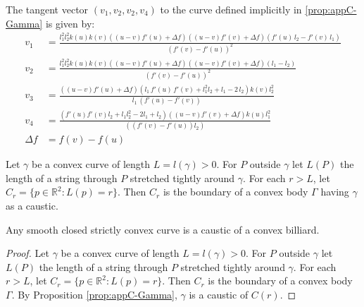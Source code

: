 \begin{remark}
The tangent vector $(v_1,v_2,v_2,v_4)$ to the curve defined implicitly in  \cref{prop:appC-Gamma} is given by:
{\small  
\begin{align*}
v_1&={\frac {l_1
^{2} l_2^{2} k \left( u \right) k \left( v \right)  \left( (u-v){f'(u)} +\Delta f \right)  \left( (u-v){f'(v)} +\Delta f \right)  \left( {f'(u)}\,{l_2}-{f'(v)}\,  
l_1 \right) }{ \left( {f'(v)}-{f'(u)} \right) ^{2}}}
\\
v_2&={\frac {l_1
^{2} l_2^{2} k \left( u \right) k \left( v \right)   \left( (u-v){f'(u)} +\Delta f \right)  \left( (u-v){f'(v)}  +\Delta f \right)  \left( {l_1}-{l_2} \right) }{
 \left(  {f'(v)}-{f'(u)} \right) ^{2}}}\\
v_3&={\frac { \left( (u-v){f'(u)} +\Delta f \right)  \left( {l_1
}\,{f'(u)}\,{f'(v)}+l_1^{2}{l_2}+{l_1}-2\,{l_2}
 \right) k(v) l_2^{2}}{{l_1}\, \left( {f'(u)}-{f'(v)
} \right) }}\\
v_4&=\frac{(f'(u) f'(v) l_2 + l_1 l_2^2 - 2 l_1 + l_2) ((u-v)f'(v)   + \Delta f) k(u) l_1^2 }{ ((f'(v) - f'(u)) l_2)}\\
 \Delta f& =f(v)-f(u)
\end{align*}
}
\end{remark}

 Let $\gamma$ be a convex curve of length $L=l(\gamma)>0$.
   For $P$  outside $\gamma$ let $ L(P)$   the length of a string through $P$ stretched tightly around $\gamma$. For each $r>L$, let $C_r=\{p\in\mathbb{R}^2: L(p)=r\}.$ Then  $C_r$ is the  boundary of a convex body $\Gamma$ having $\gamma$ as a caustic.
   
   
\begin{corollary}
  Any smooth closed strictly convex curve is a caustic of a convex billiard.
  \label{cor:appC-caustica}
\end{corollary}

\begin{proof}
 Let $\gamma$ be a convex curve of length $L=l(\gamma)>0$.
For $P$  outside $\gamma$ let $ L(P)$   the length of a string through $P$ stretched tightly around $\gamma$. For each $r>L$, let $C_r=\{p\in\mathbb{R}^2: L(p)=r\}.$ Then  $C_r$ is the  boundary of a convex body $\Gamma$. By Proposition \cref{prop:appC-Gamma},   $\gamma$ is a caustic of $C(r)$.
\end{proof}
  
